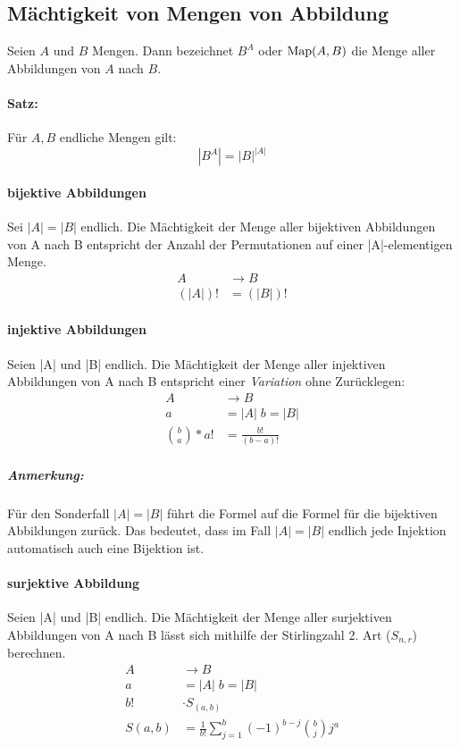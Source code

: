 \subsection{Mächtigkeit von Mengen von Abbildung}
Seien $A$ und $B$ Mengen.
Dann bezeichnet $B^A$ oder $\text{Map}(A,B)$ die Menge aller Abbildungen von $A$
nach $B$. \paragraph*{Satz:}
Für $A, B$ endliche Mengen gilt:
$$ |B^A| = {|B|}^{|A|} $$

\paragraph*{bijektive Abbildungen}
Sei $|A|=|B|$ endlich. Die Mächtigkeit der Menge aller bijektiven
Abbildungen von A nach B entspricht der Anzahl der Permutationen auf
einer |A|-elementigen Menge.
\begin{align*}
  A &\rightarrow B \\
  (|A|)! &= (|B|)!
\end{align*}

\paragraph*{injektive Abbildungen}
Seien |A| und |B| endlich. Die Mächtigkeit der Menge aller injektiven
Abbildungen von A nach B entspricht einer \emph{Variation} ohne Zurücklegen:
\begin{align*}
  A &\rightarrow B \\
  a &= |A| \; b = |B| \\
  {{b}\choose{a}} * a!
  &= \frac{b!}{(b-a)!}
\end{align*}

\subparagraph*{Anmerkung:} Für den Sonderfall $|A|=|B|$ führt die Formel auf die Formel für die bijektiven Abbildungen zurück. Das bedeutet, dass im Fall $|A|=|B|$ endlich jede Injektion
automatisch auch eine Bijektion ist.

\paragraph*{surjektive Abbildung}
Seien |A| und |B| endlich. Die Mächtigkeit der Menge aller surjektiven
Abbildungen von A nach B lässt sich mithilfe der
Stirlingzahl 2. Art ($S_{n,r}$) berechnen.
\begin{align*}
  A &\rightarrow B \\
  a &= |A| \; b = |B| \\
  b!    &\cdot S_{(a,b)}\\
  S(a,b)&=\frac{1}{b!}\sum_{j=1}^{b}(-1)^{b-j}{b \choose j}j^a
\end{align*}
